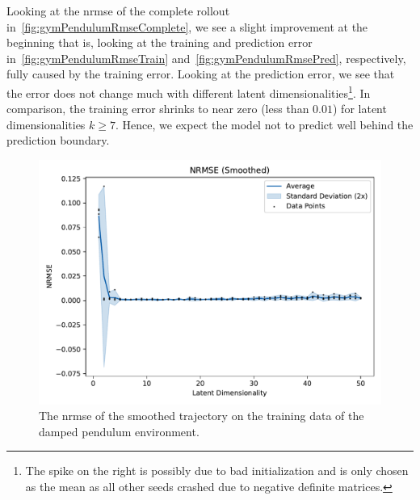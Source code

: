 			Looking at the \ac{nrmse} of the complete rollout in~\autoref{fig:gymPendulumRmseComplete}, we see a slight improvement at the beginning that is, looking at the training and prediction error in~\autoref{fig:gymPendulumRmseTrain} and~\autoref{fig:gymPendulumRmsePred}, respectively, fully caused by the training error. Looking at the prediction error, we see that the error does not change much with different latent dimensionalities\footnote{The spike on the right is possibly due to bad initialization and is only chosen as the mean as all other seeds crashed due to negative definite matrices.}. In comparison, the training error shrinks to near zero (less than \( 0.01 \)) for latent dimensionalities \( k \geq 7 \). Hence, we expect the model not to predict well behind the prediction boundary.

			\begin{figure}
				\centering
				\includegraphics[width=0.7\linewidth]{figures/results/pendulum-damped/latent-dim/comparison-rmse-smoothed-normalized-mean-vs-latent-dim.pdf}
				\caption{The \ac{nrmse} of the smoothed trajectory on the training data of the damped pendulum environment.}
				\label{fig:gymPendulumRmseSmoothed}
			\end{figure}

